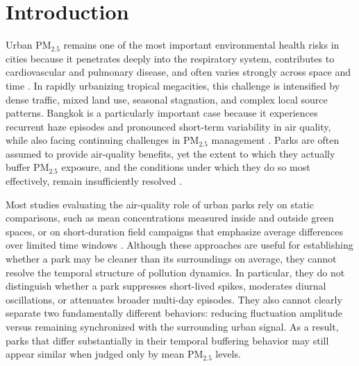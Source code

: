 \section{Introduction}

Urban PM$_{2.5}$ remains one of the most important environmental health risks in cities because it penetrates deeply into the respiratory system, contributes to cardiovascular and pulmonary disease, and often varies strongly across space and time \citep{WHO2021, Pope2006, Burnett2018, Cohen2017}. In rapidly urbanizing tropical megacities, this challenge is intensified by dense traffic, mixed land use, seasonal stagnation, and complex local source patterns. Bangkok is a particularly important case because it experiences recurrent haze episodes and pronounced short-term variability in air quality, while also facing continuing challenges in PM$_{2.5}$ management \citep{Aman2020, Narita2019, ChooChuay2020, Kanchanasuta2020}. Parks are often assumed to provide air-quality benefits, yet the extent to which they actually buffer PM$_{2.5}$ exposure, and the conditions under which they do so most effectively, remain insufficiently resolved \citep{Janhall2015, Diener2021, Abhijith2017, Venter2024}.

Most studies evaluating the air-quality role of urban parks rely on static comparisons, such as mean concentrations measured inside and outside green spaces, or on short-duration field campaigns that emphasize average differences over limited time windows \citep{Pugh2012, Su2022, Yin2019}. Although these approaches are useful for establishing whether a park may be cleaner than its surroundings on average, they cannot resolve the temporal structure of pollution dynamics. In particular, they do not distinguish whether a park suppresses short-lived spikes, moderates diurnal oscillations, or attenuates broader multi-day episodes. They also cannot clearly separate two fundamentally different behaviors: reducing fluctuation amplitude versus remaining synchronized with the surrounding urban signal. As a result, parks that differ substantially in their temporal buffering behavior may still appear similar when judged only by mean PM$_{2.5}$ levels.

